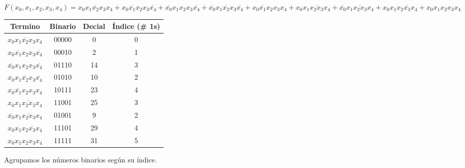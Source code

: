 \documentclass[a4paper,12pt]{article}
\begin{document}
\begin{enumerate}[label=\textcolor{teal}{\textbf{\arabic*.}}]
        \begin{center}
            $F(x_0,x_1,x_2,x_3,x_4) = 
            \overline{x_0 x_1 x_2 x_3 x_4} 
            + \overline{x_0 x_1 x_2} x_3 \overline{x_4} 
            + \overline{x_0} x_1 x_2 x_3 \overline{x_4}   
            + \overline{x_0} x_1 \overline{x_2} x_3 \overline{x_4}  
            + x_0 \overline{x_1} x_2 x_3 x_4    
            + x_0 x_1 \overline{ x_2 x_3} x_4 
            + \overline{x_0} x_1 \overline{ x_2 x_3} x_4 
            + x_0 x_1 x_2 \overline{ x_3} x_4
            + x_0 x_1 x_2 x_3 x_4
            $
        \end{center}
        
        \begin{center}
            \begin{table}[h]
            \centering
            \begin{tabular}{|c|c|c|c|}
                \hline
                Termino & Binario & Decial & Índice (\# 1s)\\ 
                \hline
                $\overline{x_0 x_1 x_2 x_3 x_4}$  & 00000 & 0 & 0 \\ 
                \hline 
                $\overline{x_0 x_1 x_2} x_3 \overline{x_4} $ & 00010 & 2 & 1 \\ 
                \hline 
                $\overline{x_0} x_1 x_2 x_3 \overline{x_4} $ & 01110 & 14 & 3 \\ 
                \hline 
                $ \overline{x_0} x_1 \overline{x_2} x_3 \overline{x_4}$ & 01010 & 10 & 2 \\ 
                \hline 
                $x_0 \overline{x_1} x_2 x_3 x_4$ & 10111 & 23 & 4 \\ 
                \hline 
                $x_0 x_1 \overline{ x_2 x_3} x_4 $ & 11001 & 25 & 3 \\ 
                \hline 
                $ \overline{x_0} x_1 \overline{ x_2 x_3} x_4 $ & 01001 & 9 & 2 \\
                \hline 
                $x_0 x_1 x_2 \overline{ x_3} x_4 $ & 11101 & 29 & 4 \\ 
                \hline
                $x_0 x_1 x_2 x_3 x_4 $ & 11111 & 31 & 5 \\ 
                \hline  
            \end{tabular}
        \end{table}
        \end{center}

        Agrupamos los números binarios según su índice.\\


\end{enumerate}
\end{document}
